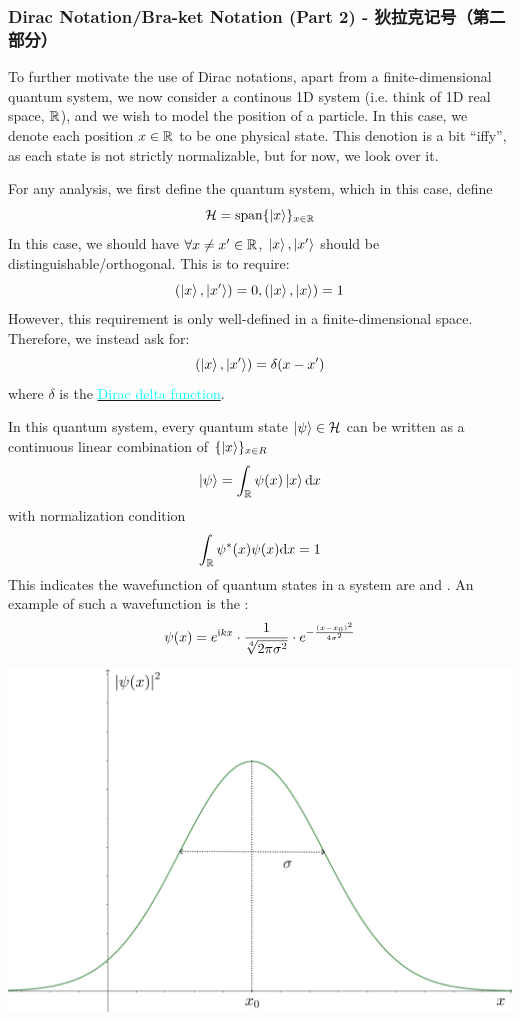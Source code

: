 \subsubsection{Dirac Notation/Bra-ket Notation (Part 2) - 狄拉克记号（第二部分）}
To further motivate the use of Dirac notations, apart from a finite-dimensional quantum system, we now consider a continous 1D system (i.e. think of 1D real space, $\mathbb{R}$), and we wish to model the position of a particle. In this case, we denote each position $x \in \mathbb{R}$ to be one physical state. This denotion is a bit ``iffy'', as each state is not strictly normalizable, but for now, we look over it. \par
For any analysis, we first define the quantum system, which in this case, define
$$\mathcal{H} = \text{span}\{\ket{x}\}_{x \in \mathbb{R}}$$
In this case, we should have $\forall x \ne x' \in \mathbb{R}$, $\ket{x}, \ket{x'}$ should be distinguishable/orthogonal. This is to require:
$$(\ket{x}, \ket{x'}) = 0, (\ket{x}, \ket{x}) = 1$$
However, this requirement is only well-defined in a finite-dimensional space. Therefore, we instead ask for:
$$(\ket{x}, \ket{x'}) = \delta(x-x')$$
where $\delta$ is the \hyperref[subsec:dirac-delta]{\textcolor{cyan}{Dirac delta function}}. \par
In this quantum system, every quantum state $\ket{\psi} \in \mathcal{H}$ can be written as a continuous linear combination of $\{\ket{x}\}_{x \in R}$
$$\ket{\psi} = \int_{\mathbb{R}} \psi(x)\ket{x} \dd x$$
with normalization condition
$$\int_{\mathbb{R}} \psi^{*}(x)\psi(x) \dd x = 1$$
This indicates the wavefunction of quantum states in a system are  and . An example of such a wavefunction is the :
$$\psi(x) = e^{\mathrm{i} k x} \cdot \frac{1}{\sqrt[4]{2\pi\sigma^2}} \cdot e^{-\frac{(x-x_0)^2}{4\sigma^2}}$$
\begin{center}
    \includegraphics[scale = 3]{gaussian-wavepacket.png}
\end{center}
